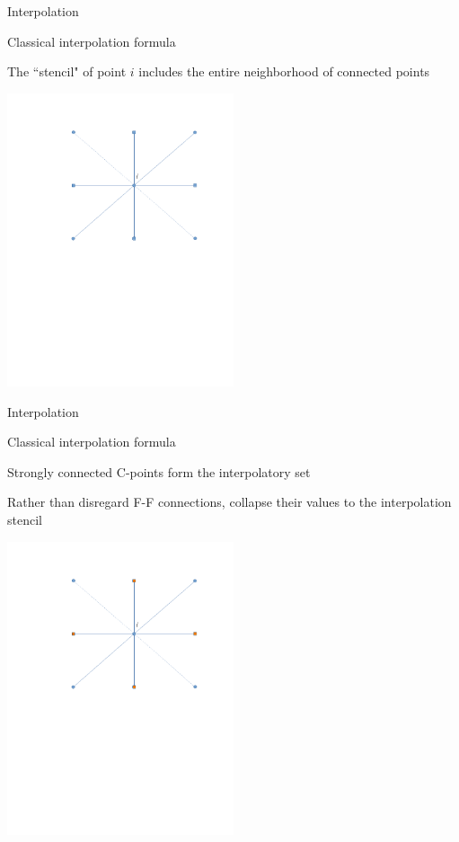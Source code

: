 \documentclass[18pt,xcolor=table]{beamer}
\begin{document}
\begin{frame}{Interpolation}
\begin{block}{Classical interpolation formula}
\bit
\item The ``stencil" of point $i$ includes the entire neighborhood of connected points
\eit
\end{block}
\begin{center}
\includegraphics[width=0.5\textwidth]{../figures/interpStencil} %
\end{center}
\end{frame}

\begin{frame}{Interpolation}
\begin{block}{Classical interpolation formula}
\bit
\item Strongly connected C-points form the interpolatory set
\item Rather than disregard F-F connections, collapse their values to the interpolation stencil
\eit
\end{block}
\begin{center}
\includegraphics[width=0.5\textwidth]{../figures/interpStencilCpts}
\end{center}
\end{frame}
\end{document}
